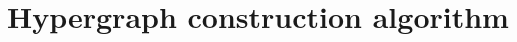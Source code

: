 \documentclass[../Master.tex]{subfiles}
\begin{document}
\providecommand{\master}{..}

\section{Hypergraph construction algorithm}\label{sec:Impl:HGConstruction}
    
\end{document}

